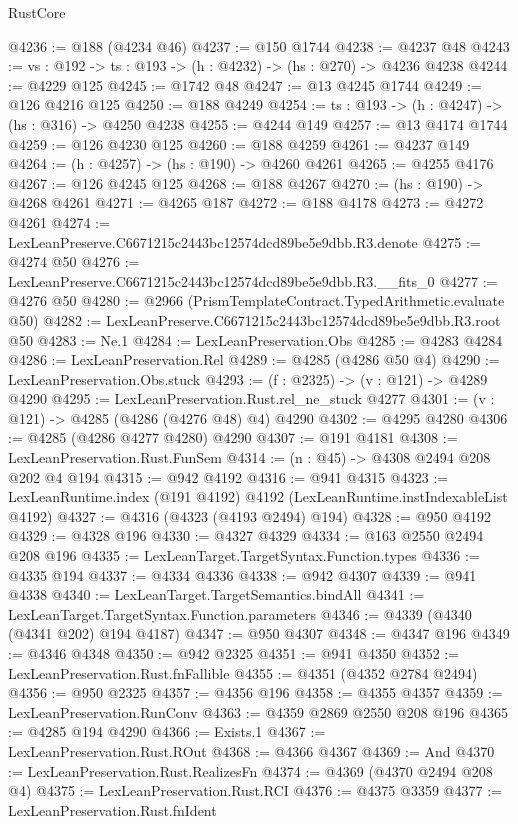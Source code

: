 \begin{lexlean}{RustCore}
\begin{coremodule}
@4236 := @188 (@4234 @46)
@4237 := @150 @1744
@4238 := @4237 @48
@4243 := {vs : @192} -> {ts : @193} -> (h : @4232) -> (hs : @270) -> @4236 @4238
@4244 := @4229 @125
@4245 := @1742 @48
@4247 := @13 @4245 @1744
@4249 := @126 @4216 @125
@4250 := @188 @4249
@4254 := {ts : @193} -> (h : @4247) -> (hs : @316) -> @4250 @4238
@4255 := @4244 @149
@4257 := @13 @4174 @1744
@4259 := @126 @4230 @125
@4260 := @188 @4259
@4261 := @4237 @149
@4264 := (h : @4257) -> (hs : @190) -> @4260 @4261
@4265 := @4255 @4176
@4267 := @126 @4245 @125
@4268 := @188 @4267
@4270 := (hs : @190) -> @4268 @4261
@4271 := @4265 @187
@4272 := @188 @4178
@4273 := @4272 @4261
@4274 := LexLeanPreserve.C6671215c2443bc12574dcd89be5e9dbb.R3.denote
@4275 := @4274 @50
@4276 := LexLeanPreserve.C6671215c2443bc12574dcd89be5e9dbb.R3.__fits_0
@4277 := @4276 @50
@4280 := @2966 (PrismTemplateContract.TypedArithmetic.evaluate @50)
@4282 := LexLeanPreserve.C6671215c2443bc12574dcd89be5e9dbb.R3.root @50
@4283 := Ne.{1}
@4284 := LexLeanPreservation.Obs
@4285 := @4283 @4284
@4286 := LexLeanPreservation.Rel
@4289 := @4285 (@4286 @50 @4)
@4290 := LexLeanPreservation.Obs.stuck
@4293 := (f : @2325) -> (v : @121) -> @4289 @4290
@4295 := LexLeanPreservation.Rust.rel_ne_stuck @4277
@4301 := (v : @121) -> @4285 (@4286 (@4276 @48) @4) @4290
@4302 := @4295 @4280
@4306 := @4285 (@4286 @4277 @4280) @4290
@4307 := @191 @4181
@4308 := LexLeanPreservation.Rust.FunSem
@4314 := (n : @45) -> @4308 @2494 @208 @202 @4 @194
@4315 := @942 @4192
@4316 := @941 @4315
@4323 := LexLeanRuntime.index (@191 @4192) @4192 (LexLeanRuntime.instIndexableList @4192)
@4327 := @4316 (@4323 (@4193 @2494) @194)
@4328 := @950 @4192
@4329 := @4328 @196
@4330 := @4327 @4329
@4334 := @163 @2550 @2494 @208 @196
@4335 := LexLeanTarget.TargetSyntax.Function.types
@4336 := @4335 @194
@4337 := @4334 @4336
@4338 := @942 @4307
@4339 := @941 @4338
@4340 := LexLeanTarget.TargetSemantics.bindAll
@4341 := LexLeanTarget.TargetSyntax.Function.parameters
@4346 := @4339 (@4340 (@4341 @202) @194 @4187)
@4347 := @950 @4307
@4348 := @4347 @196
@4349 := @4346 @4348
@4350 := @942 @2325
@4351 := @941 @4350
@4352 := LexLeanPreservation.Rust.fnFallible
@4355 := @4351 (@4352 @2784 @2494)
@4356 := @950 @2325
@4357 := @4356 @196
@4358 := @4355 @4357
@4359 := LexLeanPreservation.RunConv
@4363 := @4359 @2869 @2550 @208 @196
@4365 := @4285 @194 @4290
@4366 := Exists.{1}
@4367 := LexLeanPreservation.Rust.ROut
@4368 := @4366 @4367
@4369 := And
@4370 := LexLeanPreservation.Rust.RealizesFn
@4374 := @4369 (@4370 @2494 @208 @4)
@4375 := LexLeanPreservation.Rust.RCI
@4376 := @4375 @3359
@4377 := LexLeanPreservation.Rust.fnIdent

\end{coremodule}
\end{lexlean}
